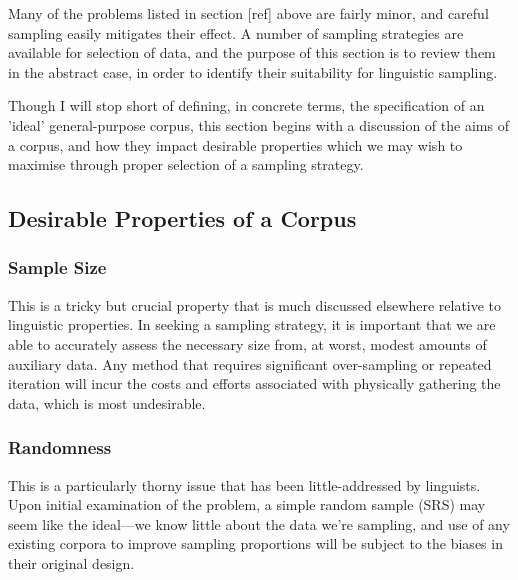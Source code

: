 









Many of the problems listed in section [ref] above are fairly minor, and careful sampling easily mitigates their effect.  A number of sampling strategies are available for selection of data, and the purpose of this section is to review them in the abstract case, in order to identify their suitability for linguistic sampling.

Though I will stop short of defining, in concrete terms, the specification of an 'ideal' general-purpose corpus, this section begins with a discussion of the aims of a corpus, and how they impact desirable properties which we may wish to maximise through proper selection of a sampling strategy. 


\subsection{Desirable Properties of a Corpus}



\subsubsection{Sample Size}
This is a tricky but crucial property that is much discussed elsewhere relative to linguistic properties.  In seeking a sampling strategy, it is important that we are able to accurately assess the necessary size from, at worst, modest amounts of auxiliary data.  Any method that requires significant over-sampling or repeated iteration will incur the costs and efforts associated with physically gathering the data, which is most undesirable.



\subsubsection{Randomness}
This is a particularly thorny issue that has been little-addressed by linguists.  Upon initial examination of the problem, a simple random sample (SRS) may seem like the ideal---we know little about the data we're sampling, and use of any existing corpora to improve sampling proportions will be subject to the biases in their original design.  

